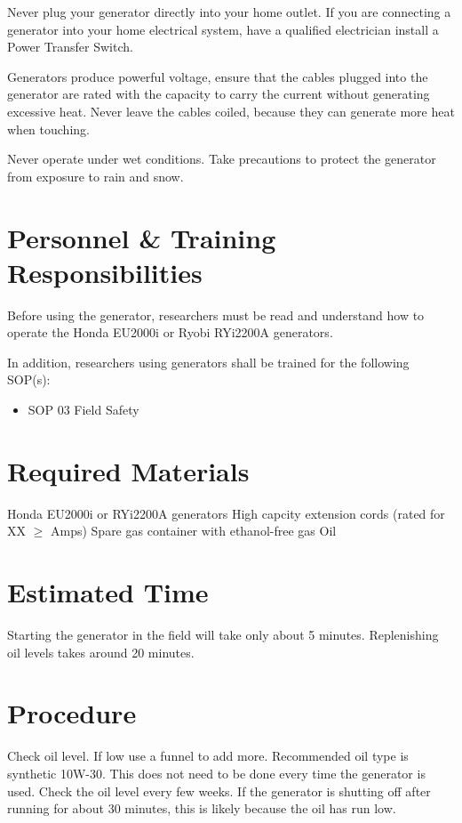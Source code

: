 \documentclass[12pt]{../SOP3_alpha}
\begin{document}
\NP Never plug your generator directly into your home outlet. If you are connecting a generator into your home electrical system, have a qualified electrician install a Power Transfer Switch.

\NP Generators produce powerful voltage, ensure that the cables plugged into the generator are rated with the capacity to carry the current without generating excessive heat. Never leave the cables coiled, because they can generate more heat when touching.

\NP Never operate under wet conditions. Take precautions to protect the generator from exposure to rain and snow. 

\section{Personnel \& Training Responsibilities}

\NP Before using the generator, researchers must be read and understand how to operate the Honda EU2000i or Ryobi RYi2200A generators. 

\NP In addition, researchers using generators shall be trained for the following SOP(s):

\begin{itemize}
  \item SOP 03 Field Safety
\end{itemize}

\section{Required Materials}

\NP Honda EU2000i or RYi2200A generators
\NP High capcity extension cords (rated for XX $\geq$ Amps)
\NP Spare gas container with ethanol-free gas
\NP Oil

\section{Estimated Time}

\NP Starting the generator in the field will take only about 5 minutes. Replenishing oil levels takes around 20 minutes. 

\section{Procedure}

\NP Check oil level. If low use a funnel to add more. Recommended oil type is synthetic 10W-30. This does not need to be done every time the generator is used. Check the oil level every few weeks. If the generator is shutting off after running for about 30 minutes, this is likely because the oil has run low.
\end{document}

